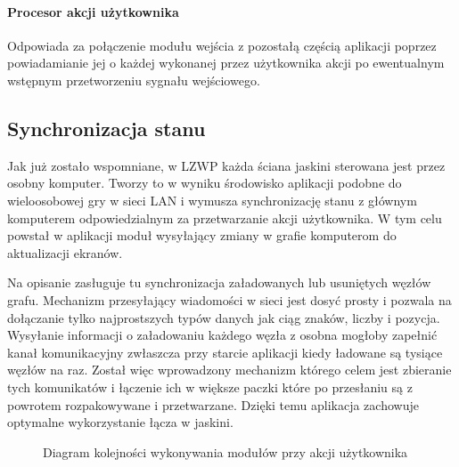 \paragraph{Procesor akcji użytkownika}
Odpowiada za połączenie modułu wejścia z pozostałą częścią aplikacji poprzez powiadamianie jej o każdej wykonanej przez użytkownika akcji po ewentualnym wstępnym przetworzeniu sygnału wejściowego.



\subsection{Synchronizacja stanu}
Jak już zostało wspomniane, w LZWP każda ściana jaskini sterowana jest przez osobny komputer. Tworzy to w wyniku środowisko aplikacji podobne do wieloosobowej gry w sieci LAN i wymusza synchronizację stanu z głównym komputerem odpowiedzialnym za przetwarzanie akcji użytkownika. W tym celu powstał w aplikacji moduł wysyłający zmiany w grafie komputerom do aktualizacji ekranów. 

Na opisanie zasługuje tu synchronizacja załadowanych lub usuniętych węzłów grafu. Mechanizm przesyłający wiadomości w sieci jest dosyć prosty i pozwala na dołączanie tylko najprostszych typów danych jak ciąg znaków, liczby i pozycja. Wysyłanie informacji o załadowaniu każdego węzła z osobna mogłoby zapełnić kanał komunikacyjny zwłaszcza przy starcie aplikacji kiedy ładowane są tysiące węzłów na raz. Został więc wprowadzony mechanizm którego celem jest zbieranie tych komunikatów i łączenie ich w większe paczki które po przesłaniu są z powrotem rozpakowywane i przetwarzane. Dzięki temu aplikacja zachowuje optymalne wykorzystanie łącza w jaskini.

\begin{figure}[H]
\begin{center}
\end{center}
\caption{Diagram kolejności wykonywania modułów przy akcji użytkownika}
\end{figure}


